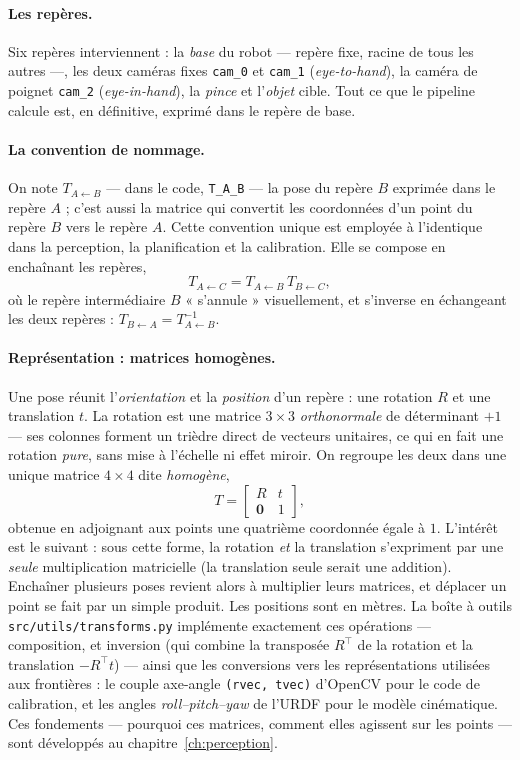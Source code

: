 \paragraph{Les repères.} Six repères interviennent : la \emph{base} du robot --- repère fixe, racine de tous les autres ---, les deux caméras fixes \texttt{cam\_0} et \texttt{cam\_1} (\emph{eye-to-hand}), la caméra de poignet \texttt{cam\_2} (\emph{eye-in-hand}), la \emph{pince} et l'\emph{objet} cible. Tout ce que le pipeline calcule est, en définitive, exprimé dans le repère de base.

\paragraph{La convention de nommage.} On note $T_{A\leftarrow B}$ --- dans le code, \texttt{T\_A\_B} --- la pose du repère $B$ exprimée dans le repère $A$ ; c'est aussi la matrice qui convertit les coordonnées d'un point du repère $B$ vers le repère $A$. Cette convention unique est employée à l'identique dans la perception, la planification et la calibration. Elle se compose en enchaînant les repères,
\[
  T_{A\leftarrow C} = T_{A\leftarrow B}\,T_{B\leftarrow C},
\]
où le repère intermédiaire $B$ « s'annule » visuellement, et s'inverse en échangeant les deux repères : $T_{B\leftarrow A} = T_{A\leftarrow B}^{-1}$.

\paragraph{Représentation : matrices homogènes.} Une pose réunit l'\emph{orientation} et la \emph{position} d'un repère : une rotation $R$ et une translation $t$. La rotation est une matrice $3\times3$ \emph{orthonormale} de déterminant $+1$ --- ses colonnes forment un trièdre direct de vecteurs unitaires, ce qui en fait une rotation \emph{pure}, sans mise à l'échelle ni effet miroir. On regroupe les deux dans une unique matrice $4\times4$ dite \emph{homogène},
\[
  T = \begin{bmatrix} R & t \\ \mathbf{0} & 1 \end{bmatrix},
\]
obtenue en adjoignant aux points une quatrième coordonnée égale à $1$. L'intérêt est le suivant : sous cette forme, la rotation \emph{et} la translation s'expriment par une \emph{seule} multiplication matricielle (la translation seule serait une addition). Enchaîner plusieurs poses revient alors à multiplier leurs matrices, et déplacer un point se fait par un simple produit. Les positions sont en mètres. La boîte à outils \texttt{src/utils/transforms.py} implémente exactement ces opérations --- composition, et inversion (qui combine la transposée $R^{\top}$ de la rotation et la translation $-R^{\top}t$) --- ainsi que les conversions vers les représentations utilisées aux frontières : le couple axe-angle \texttt{(rvec, tvec)} d'OpenCV pour le code de calibration, et les angles \emph{roll--pitch--yaw} de l'URDF pour le modèle cinématique. Ces fondements --- pourquoi ces matrices, comment elles agissent sur les points --- sont développés au chapitre~\ref{ch:perception}.


